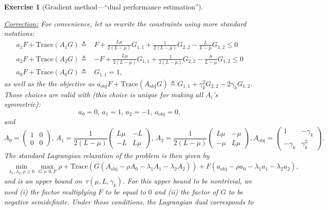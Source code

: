 \documentclass[11pt,a4paper]{article}
\newcommand{\correction}[1]{{{\color{blue}\underline{Correction:} #1}}}
\newcommand{\correction}[1]{}
\newtheorem{exercise}{Exercise}
\begin{document}
\begin{exercise}[Gradient method---``dual performance estimation'']
\begin{enumerate}
		\correction{For convenience, let us rewrite the constraints using more standard notations:
	\begin{equation*}
			\begin{aligned}
			a_1 F+\mathrm{Trace}(A_1 G)\triangleq& F + \tfrac{L\mu}{2(L-\mu)} G_{1,1}+\tfrac{1}{2(L-\mu)}G_{2,2}-\tfrac{L}{L-\mu}G_{1,2}\leqslant 0\\
			a_2 F+\mathrm{Trace}(A_2 G)\triangleq&-F + \tfrac{L\mu}{2(L-\mu)} G_{1,1}+\tfrac{1}{2(L-\mu)}G_{2,2}-\tfrac{\mu}{L-\mu}G_{1,2}\leqslant 0\\
			a_0F+\mathrm{Trace}(A_0 G)\triangleq&G_{1,1}= 1,
			\end{aligned}
	\end{equation*}
	as well as the the objective as $a_{\text{obj}}F+\mathrm{Trace}(A_{\text{obj}}G)\triangleq G_{1,1}+\gamma_k ^2 G_{2,2}-2\gamma_k G_{1,2}$. Those choices are valid with (this choice is unique for making all $A_i$'s symmetric):
	\[ a_0=0,\,a_1=1,\,a_2=-1,\,a_{\text{obj}}=0, \]
	and 
	\[
	A_0=\begin{pmatrix}
	1 & 0 \\ 0 & 0
	\end{pmatrix},\,
	A_1=\frac{1}{2(L-\mu)}\begin{pmatrix}
	L\mu & -L \\ -L & L\mu
	\end{pmatrix},\,
	A_2=\frac{1}{2(L-\mu)}\begin{pmatrix}
	L\mu & -\mu \\ -\mu & L\mu
	\end{pmatrix},
	A_{\text{obj}}=\begin{pmatrix}
	1 & -\gamma_k\\ -\gamma_k & \gamma_k^2
	\end{pmatrix}.\]
	The standard Lagrangian relaxation of the problem is then given by
	\begin{equation}
	\begin{aligned}
	\min_{\lambda_1,\lambda_2,\rho\geqslant 0}\max_{G\succeq 0,F} \rho+\mathrm{Trace}\left(G (A_{\text{obj}}-\rho A_0-\lambda_1 A_1-\lambda_2 A_2)\right)+F(a_{\text{obj}}-\rho a_0-\lambda_1a_1-\lambda_2 a_2),
	\end{aligned}
	\end{equation}		
	and is an upper bound on~$\tau(\mu,L,\gamma_k)$. For this upper bound to be nontrivial, we need (i) the factor multiplying $F$ to be equal to $0$ and (ii) the factor of $G$ to be negative semidefinite. Under those conditions, the Lagrangian dual corresponds to
	\begin{equation}\label{ex2:eq:dual_formulation_from_Lagrangian}

\end{equation}}
\end{enumerate}
\end{exercise}
\end{document}
